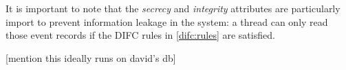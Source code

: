 It is important to note that the \emph{secrecy} and \emph{integrity} attributes are particularly import to prevent information leakage in the system: a thread can only read those event records if the DIFC rules in \ref{difc:rules} are satisfied.

[mention this ideally runs on david's db]










